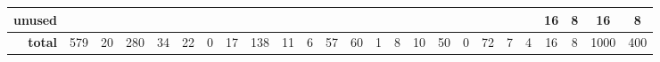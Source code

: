 \begin{table*}[htp!]
\begin{adjustbox}{max width=\textwidth}
\begin{tabular}{r|cc|cc|cc|cc|cc|cc|cc|cc|cc|cc|cc|cc}
             \textbf{unused} &      &      &      &      &      &      &       &      &        &      &      &      &      &      &        &      &       &      &         &      &     16 &    8 &    16 &    8 \\ \hline
                  \textbf{total} &  579 &   20 &  280 &   34 &   22 &    0 &    17 &  138 &     11 &    6 &   57 &   60 &    1 &    8 &     10 &   50 &     0 &   72 &       7 &    4 &     16 &    8 &  1000 &  400 \\
\end{tabular}

    \end{adjustbox}
        \vspace{-10pt}
\end{table*}